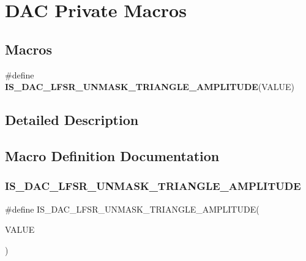 \hypertarget{group___d_a_c_ex___private___macros}{}\section{D\+AC Private Macros}
\label{group___d_a_c_ex___private___macros}
\subsection*{Macros}
\begin{DoxyCompactItemize}
\item 
\#define {\bfseries I\+S\+\_\+\+D\+A\+C\+\_\+\+L\+F\+S\+R\+\_\+\+U\+N\+M\+A\+S\+K\+\_\+\+T\+R\+I\+A\+N\+G\+L\+E\+\_\+\+A\+M\+P\+L\+I\+T\+U\+DE}(V\+A\+L\+UE)
\end{DoxyCompactItemize}


\subsection{Detailed Description}


\subsection{Macro Definition Documentation}
\mbox{\label{group___d_a_c_ex___private___macros_ga20f7c3c43f917f14593f0c478c2412e1}} 
\subsubsection{\texorpdfstring{IS\_DAC\_LFSR\_UNMASK\_TRIANGLE\_AMPLITUDE}{IS\_DAC\_LFSR\_UNMASK\_TRIANGLE\_AMPLITUDE}}
{\footnotesize\ttfamily \#define I\+S\+\_\+\+D\+A\+C\+\_\+\+L\+F\+S\+R\+\_\+\+U\+N\+M\+A\+S\+K\+\_\+\+T\+R\+I\+A\+N\+G\+L\+E\+\_\+\+A\+M\+P\+L\+I\+T\+U\+DE(\begin{DoxyParamCaption}\item[{}]{V\+A\+L\+UE }\end{DoxyParamCaption})}

